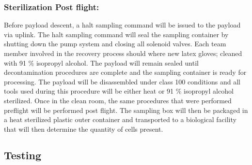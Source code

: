 \subsubsection{Sterilization Post flight:}
Before payload descent, a halt sampling command will be issued to the payload via uplink. The
halt sampling command will seal the sampling container by shutting down the pump system and closing all solenoid valves. Each team member involved in the recovery process should where new latex gloves; cleaned with 91 \% isopropyl alcohol. The payload will remain sealed until decontamination procedures are complete and the sampling container is ready for processing. The payload will be disassembled under class 100 conditions and all tools used during this procedure will be either heat or 91 \% isopropyl alcohol sterilized. Once in the clean room, the same procedures that were performed preflight will be performed post flight. The sampling box will then be packaged in a heat sterilized plastic outer container and transported to a biological facility that will then determine the quantity of cells present.


\subsection{Testing}

